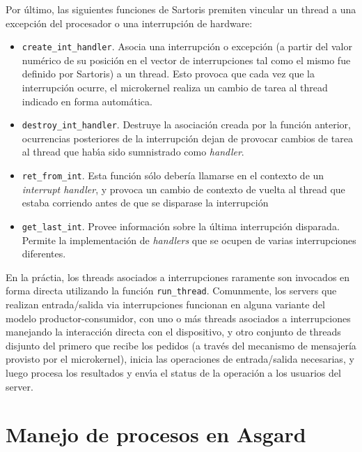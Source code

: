 \documentclass[11pt, letterpaper, twoside]{book}
\begin{document}
Por \'ultimo, las siguientes funciones de Sartoris premiten vincular un thread a una excepci\'on del procesador o una interrupci\'on de hardware:

\begin{itemize}

\item[] \texttt{create\_int\_handler}. Asocia una interrupci\'on o excepci\'on (a partir del valor num\'erico de su posici\'on en el vector de interrupciones tal como el mismo fue definido por Sartoris) a un thread. Esto provoca que cada vez que la interrupci\'on ocurre, el microkernel realiza un cambio de tarea al thread indicado en forma autom\'atica.
\item[] \texttt{destroy\_int\_handler}. Destruye la asociaci\'on creada por la funci\'on anterior, ocurrencias posteriores de la interrupci\'on dejan de provocar cambios de tarea al thread que hab\'\i{}a sido sumnistrado como \emph{handler}.
\item[] \texttt{ret\_from\_int}. Esta funci\'on s\'olo deber\'ia llamarse en el contexto de un \emph{interrupt handler}, y provoca un cambio de contexto de vuelta al thread que estaba corriendo antes de que se disparase la interrupci\'on
\item[] \texttt{get\_last\_int}. Provee informaci\'on sobre la \'ultima interrupci\'on disparada. Permite la implementaci\'on de \emph{handlers} que se ocupen de varias interrupciones diferentes.

\end{itemize}

En la pr\'actia, los threads asociados a interrupciones raramente son invocados en forma directa utilizando la funci\'on \texttt{run\_thread}. Comunmente, los servers que realizan entrada/salida via interrupciones funcionan en alguna variante del modelo productor-consumidor, con uno o m\'as threads asociados a interrupciones manejando la interacci\'on directa con el dispositivo, y otro conjunto de threads disjunto del primero que recibe los pedidos (a trav\'es del mecanismo de mensajer\'ia provisto por el microkernel), inicia las operaciones de entrada/salida necesarias, y luego procesa los resultados y env\'\i{}a el status de la operaci\'on a los usuarios del server.


\chapter{Manejo de procesos en Asgard} \label{procesos}
\end{document}
